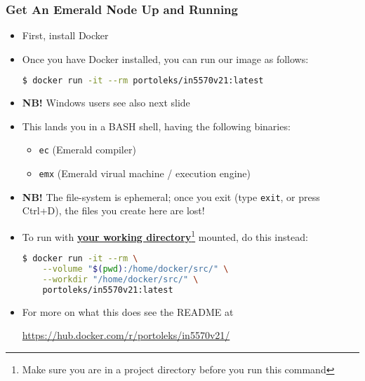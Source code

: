\begin{frame}[fragile]

\frametitle{Get An Emerald Node Up and Running}

\begin{itemize}

\footnotesize

\item First, install Docker

\item Once you have Docker installed, you can run our image as follows:

\vspace{-0.05in}

\begin{lstlisting}[language=bash]
$ docker run -it --rm portoleks/in5570v21:latest
\end{lstlisting}

\item \textbf{NB!} Windows users see also next slide

\item This lands you in a BASH shell, having the following binaries:

\begin{itemize}

\footnotesize

\item \texttt{ec} (Emerald compiler)

\item \texttt{emx} (Emerald virual machine / execution engine)

\end{itemize}

\item \textbf{NB!} The file-system is ephemeral; once you exit (type
\texttt{exit}, or press Ctrl+D), the files you create here are lost!

\item To run with \textbf{\underline{your working
directory}}\footnote{Make sure you are in a project directory before
you run this command} mounted, do this instead:

\vspace{-0.05in}

\begin{lstlisting}[language=bash]
$ docker run -it --rm \
    --volume "$(pwd):/home/docker/src/" \
    --workdir "/home/docker/src/" \
    portoleks/in5570v21:latest
\end{lstlisting}

\item For more on what this does see the README at

\url{https://hub.docker.com/r/portoleks/in5570v21/}

\end{itemize}

\end{frame}


